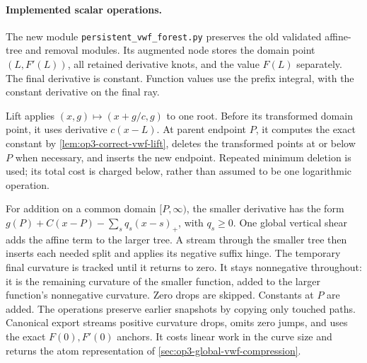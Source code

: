 \paragraph{Implemented scalar operations.}
The new module \texttt{persistent\_vwf\_forest.py} preserves the old
validated affine-tree and removal modules. Its augmented node stores
the domain point $(L,F'(L))$, all retained derivative knots, and the
value $F(L)$ separately. The final derivative is constant. Function values
use the prefix integral, with the constant derivative on the final ray.

Lift applies $(x,g)\mapsto(x+g/c,g)$ to one root. Before its transformed
domain point, it uses derivative $c(x-L)$. At parent endpoint $P$, it
computes the exact constant by \cref{lem:op3-correct-vwf-lift}, deletes
the transformed points at or below $P$ when necessary, and inserts the
new endpoint. Repeated minimum deletion is used; its total cost is charged
below, rather than assumed to be one logarithmic operation.

For addition on a common domain $[P,\infty)$, the smaller derivative has
the form $g(P)+C(x-P)-\sum_s q_s(x-s)_+$, with $q_s\geq0$.
One global vertical shear adds the affine term to the larger tree.
A stream through the smaller tree then inserts each needed split and
applies its negative suffix hinge. The temporary final curvature is tracked
until it returns to zero. It stays nonnegative throughout: it is the
remaining curvature of the smaller function, added to the larger function's
nonnegative curvature. Zero drops are skipped. Constants at $P$ are added.
The operations preserve earlier snapshots by copying only touched paths.
Canonical export streams positive curvature drops, omits zero jumps, and
uses the exact $F(0),F'(0)$ anchors. It costs linear work in the curve size
and returns the atom representation of \cref{sec:op3-global-vwf-compression}.

